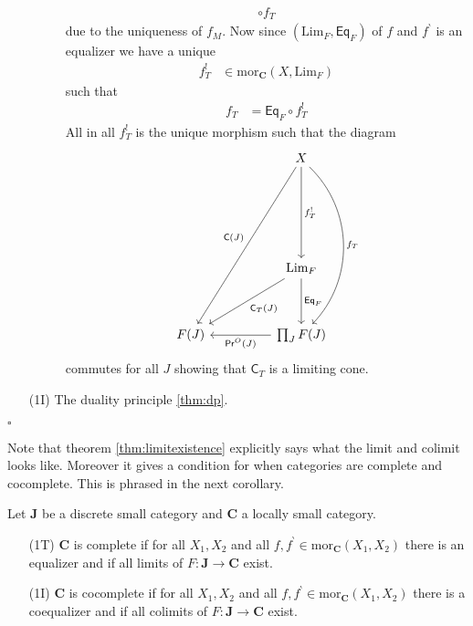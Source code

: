 \begin{prf}
\begin{enumerate}
\begin{description}
\begin{align*}
  \circ
  f_{T}
\end{align*}
due to the uniqueness of $f_{M}$. Now since $(\mathrm{Lim}_{F},\mathsf{Eq}_{F})$ of $f$ and $f^{\backprime}$ is an equalizer we have a unique
\begin{align*}
  f_{T}^{!}
  &\in
  \mathrm{mor}_{\mathbf{C}}
  \left(
    X,
    \mathrm{Lim}_{F}
  \right)
\end{align*}
such that
\begin{align*}
  f_{T}
  &=
  \mathsf{Eq}_{F}
  \circ
  f_{T}^{!}
\end{align*}
All in all $f_{T}^{!}$ is the unique morphism such that the diagram
\[
\begin{tikzcd}[sep=huge]
  &
  X
  \arrow[bend left=45]{ddd}{f_{T}}
  \arrow{dd}{f_{T}^{!}}
  \arrow[swap]{dddl}{\mathsf{C}(J)}
  \\
  &
  \\
  &
  \mathrm{Lim}_{F}
  \arrow{d}{\mathsf{Eq}_{F}}
  \arrow{dl}{\mathsf{C}_{T}(J)}
  \\
  F(J)
  &
  \prod_{J}
  F(J)
  \arrow{l}{\mathsf{Pr}^{O}(J)}
\end{tikzcd}
\]
commutes for all $J$ showing that $\mathsf{C}_{T}$ is a limiting cone.
\end{description}
\item[(1I)]
The duality principle \ref{thm:dp}.
\end{enumerate}
\phantom{proven}
\hfill
$\square$
\end{prf}
Note that theorem \ref{thm:limitexistence} explicitly says what the limit and colimit looks like. Moreover it gives a condition for when categories are complete and cocomplete. This is phrased in the next corollary.
\\
\begin{cor}
\label{cor:completeness}
Let $\mathbf{J}$ be a discrete small category and $\mathbf{C}$ a locally small category.
\begin{enumerate}
\item[(1T)]
$\mathbf{C}$ is complete if for all $X_{1},X_{2}$ and all $f,f^{\backprime} \in \mathrm{mor}_{\mathbf{C}}(X_{1},X_{2})$ there is an equalizer and if all limits of $F \colon \mathbf{J} \rightarrow \mathbf{C}$ exist.
\item[(1I)]
$\mathbf{C}$ is cocomplete if for all $X_{1},X_{2}$ and all $f,f^{\backprime} \in \mathrm{mor}_{\mathbf{C}}(X_{1},X_{2})$ there is a coequalizer and if all colimits of $F \colon \mathbf{J} \rightarrow \mathbf{C}$ exist. 
\end{enumerate}
\end{cor}
